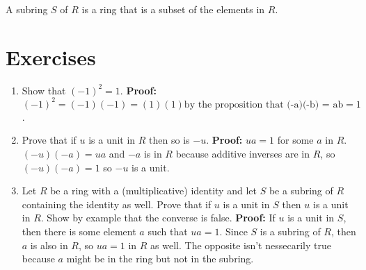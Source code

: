 \documentclass{article}
\begin{document}
\begin{definition}[Subrings]
A subring $S$ of $R$ is a ring that is a subset of the elements in $R$. 
\end{definition}

\section{Exercises}

\begin{enumerate}
    \item Show that $(-1)^2 = 1$. \textbf{Proof:} $(-1)^2 = (-1)(-1) = (1)(1) \text{by the proposition that (-a)(-b) = ab} = 1$.
    \item Prove that if $u$ is a unit in $R$ then so is $-u$. \textbf{Proof:} $ua = 1$ for some $a$ in $R$. $(-u)(-a) = ua$ and $-a$ is in $R$ because additive inverses are in $R$, so $(-u)(-a) = 1$ so $-u$ is a unit. 
    \item Let $R$ be a ring with a (multiplicative) identity and let $S$ be a subring of $R$ containing the identity as well. Prove that if $u$ is a unit in $S$ then $u$ is a unit in $R$. Show by example that the converse is false. \textbf{Proof:} If $u$ is a unit in $S$, then there is some element $a$ such that $ua = 1$. Since $S$ is a subring of $R$, then $a$ is also in $R$, so $ua = 1$ in $R$ as well. The opposite isn't nessecarily true because $a$ might be in the ring but not in the subring. 
\end{enumerate}
\end{document}
